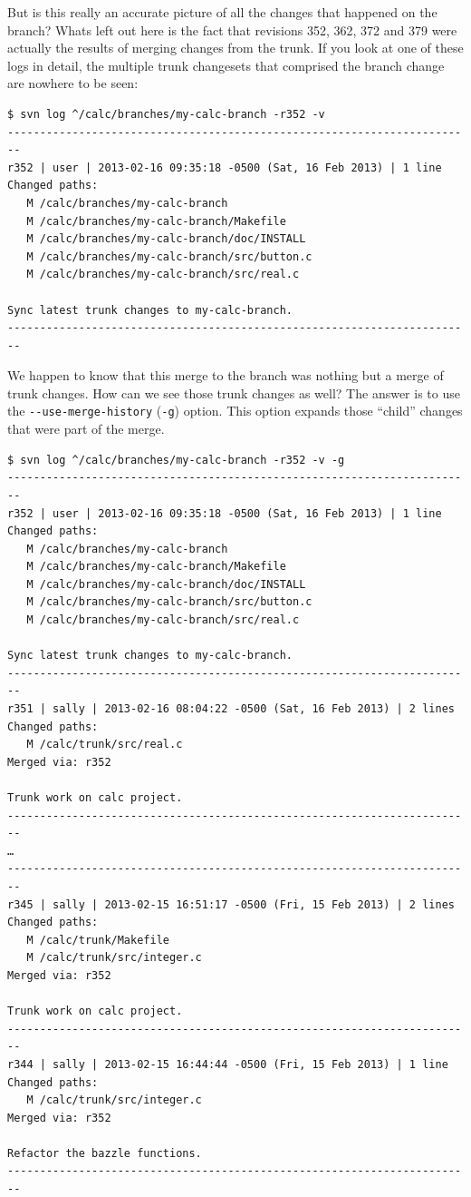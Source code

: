 But is this really an accurate picture of all the changes that happened
on the branch? What\textquotesingle s left out here is the fact that
revisions 352, 362, 372 and 379 were actually the results of merging
changes from the trunk. If you look at one of these logs in detail, the
multiple trunk changesets that comprised the branch change are nowhere
to be seen:

\begin{verbatim}
$ svn log ^/calc/branches/my-calc-branch -r352 -v
------------------------------------------------------------------------
r352 | user | 2013-02-16 09:35:18 -0500 (Sat, 16 Feb 2013) | 1 line
Changed paths:
   M /calc/branches/my-calc-branch
   M /calc/branches/my-calc-branch/Makefile
   M /calc/branches/my-calc-branch/doc/INSTALL
   M /calc/branches/my-calc-branch/src/button.c
   M /calc/branches/my-calc-branch/src/real.c

Sync latest trunk changes to my-calc-branch.
------------------------------------------------------------------------
\end{verbatim}

We happen to know that this merge to the branch was nothing but a merge
of trunk changes. How can we see those trunk changes as well? The answer
is to use the \texttt{-\/-use-merge-history} (\texttt{-g}) option. This
option expands those ``child'' changes that were part of the merge.

\begin{verbatim}
$ svn log ^/calc/branches/my-calc-branch -r352 -v -g
------------------------------------------------------------------------
r352 | user | 2013-02-16 09:35:18 -0500 (Sat, 16 Feb 2013) | 1 line
Changed paths:
   M /calc/branches/my-calc-branch
   M /calc/branches/my-calc-branch/Makefile
   M /calc/branches/my-calc-branch/doc/INSTALL
   M /calc/branches/my-calc-branch/src/button.c
   M /calc/branches/my-calc-branch/src/real.c

Sync latest trunk changes to my-calc-branch.
------------------------------------------------------------------------
r351 | sally | 2013-02-16 08:04:22 -0500 (Sat, 16 Feb 2013) | 2 lines
Changed paths:
   M /calc/trunk/src/real.c
Merged via: r352

Trunk work on calc project.
------------------------------------------------------------------------
…
------------------------------------------------------------------------
r345 | sally | 2013-02-15 16:51:17 -0500 (Fri, 15 Feb 2013) | 2 lines
Changed paths:
   M /calc/trunk/Makefile
   M /calc/trunk/src/integer.c
Merged via: r352

Trunk work on calc project.
------------------------------------------------------------------------
r344 | sally | 2013-02-15 16:44:44 -0500 (Fri, 15 Feb 2013) | 1 line
Changed paths:
   M /calc/trunk/src/integer.c
Merged via: r352

Refactor the bazzle functions.
------------------------------------------------------------------------
\end{verbatim}


